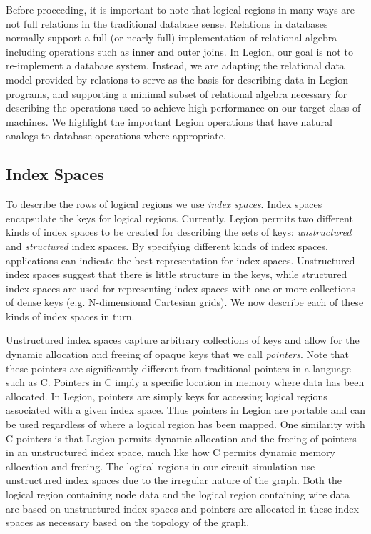 Before proceeding, it is important to note that logical
regions in many ways are not full relations in the
traditional database sense. Relations in databases
normally support a full (or nearly full) implementation
of relational algebra including operations such as inner 
and outer joins. In Legion, our goal is not to re-implement
a database system. Instead, we are adapting the
relational data model provided by relations to
serve as the basis for describing data in Legion
programs, and supporting a minimal subset of relational
algebra necessary for describing the operations
used to achieve high performance on our target class of
machines. We highlight the important Legion operations
that have natural analogs to database operations where
appropriate.

\subsection{Index Spaces}
\label{subsec:indexspace}
To describe the rows of logical regions we use
{\em index spaces}.  Index spaces encapsulate
the keys for logical regions. Currently, Legion
permits two different kinds of index spaces
to be created for describing the sets of
keys: {\em unstructured} and {\em structured}
index spaces. By specifying different kinds of
index spaces, applications can indicate the best
representation for index spaces. Unstructured
index spaces suggest that there is little
structure in the keys, while structured index
spaces are used for representing index spaces
with one or more collections of dense keys
(e.g. N-dimensional Cartesian grids). We now
describe each of these kinds of index spaces
in turn.

Unstructured index spaces capture arbitrary
collections of keys and allow
for the dynamic allocation and freeing of 
opaque keys that we call {\em pointers}. Note
that these pointers are significantly different
from traditional pointers in a language such as
C. Pointers in C imply a specific location in
memory where data has been allocated. In Legion,
pointers are simply keys for accessing logical
regions associated with a given index space.
Thus pointers in Legion are portable and can
be used regardless of where a logical region
has been mapped. One similarity with C pointers
is that Legion permits dynamic allocation and the freeing 
of pointers in an unstructured index space, much
like how C permits dynamic memory allocation
and freeing. The logical regions in our 
circuit simulation use unstructured index spaces
due to the irregular nature of the graph. Both
the logical region containing node data and the
logical region containing wire data are based on 
unstructured index spaces and pointers are allocated 
in these index spaces as necessary based on 
the topology of the graph.

